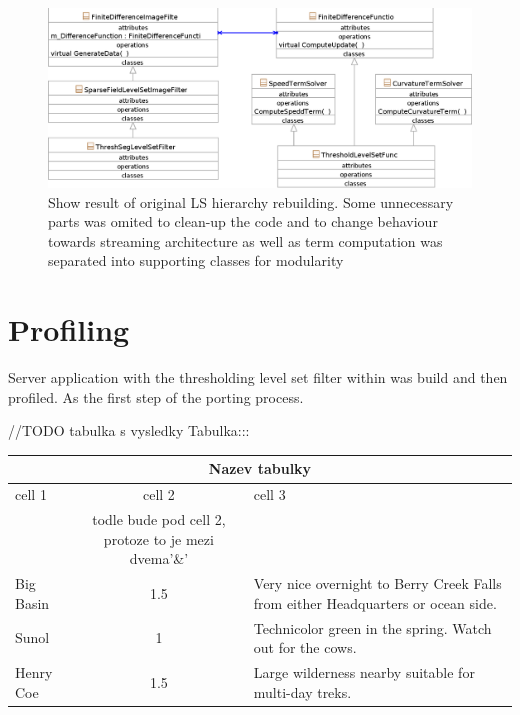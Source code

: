 \begin{figure}
    \centering
    \includegraphics[width=15cm]{data/resultingFilter}
    \caption[Resulting level set filter ready to be ported to Cell B.E.]
    {
Show result of original LS hierarchy rebuilding.
Some unnecessary parts was omited to clean-up the code and to change behaviour towards streaming architecture as well as term computation was separated into supporting classes for modularity
    }
    \label{fg:resultingFilter}
\end{figure}

\section{Profiling}

Server application with the thresholding level set filter within was build and then profiled. As the first step of the porting process.

//TODO tabulka s vysledky
Tabulka:::
\begin{center}
\begin{tabular}{|l|c|p{3.5in}|}
\hline
\multicolumn{3}{|c|}{Nazev tabulky}\\
\hline cell 1&cell 2&cell 3\\&todle bude pod cell 2, protoze to je mezi dvema'\&' &\\
\hline Big Basin&1.5&Very nice overnight to Berry Creek Falls from
either Headquarters or ocean side.\\
\hline Sunol&1&Technicolor green in the spring. Watch out for the cows.\\
\hline Henry Coe&1.5&Large wilderness nearby suitable for multi-day treks.\\
\hline
\end{tabular}
\end{center}

